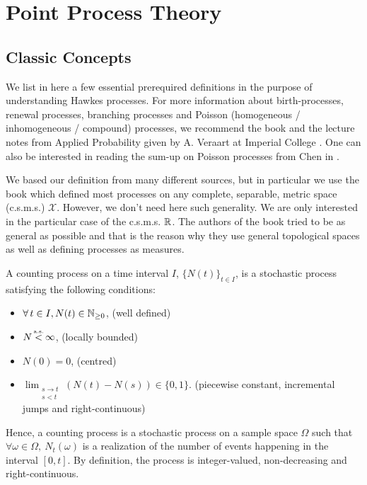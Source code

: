 \documentclass[11pt]{book}
\begin{document}
\section{Point Process Theory}
\subsection{Classic Concepts}
We list in here a few essential prerequired definitions in the purpose of understanding Hawkes processes. For more information about birth-processes, renewal processes, branching processes and Poisson (homogeneous / inhomogeneous / compound) processes, we recommend the book \cite{Grimmett} and the lecture notes from Applied Probability given by A. Veraart at Imperial College \cite{Veraart}. One can also be interested in reading the sum-up on Poisson processes from Chen in \cite{simulchen}.

We based our definition from many different sources, but in particular we use the book \cite{daley} which defined most processes on any complete, separable, metric space (c.s.m.s.) $\mathcal X$. However, we don't need here such generality. We are only interested in the particular case of the c.s.m.s. $\mathbb{R}$. The authors of the book \cite{daley} tried to be as general as possible and that is the reason why they use general topological spaces as well as defining processes as measures. 

\begin{definition}
A counting process on a time interval $I$, $\{N(t)\}_{t \in I}$, is a stochastic process satisfying the following conditions: 
\begin{itemize}
\item $ \forall t \in I, N(t) \in \N $, (well defined)
\item  $N  \stackrel{\mathclap{\mbox{\normalfont\tiny a.s.}}}{<} \infty$, (locally bounded)
\item $ N(0) = 0$, (centred)
\item $ \lim_{ \substack{ s \to t \\ s < t}  } \left ( N(t) - N(s) \right ) \in \{0,1\}$. (piecewise constant, incremental jumps and right-continuous)
\end{itemize}
\end{definition}

Hence, a counting process is a stochastic process on a sample space $\Omega$ such that $ \forall \omega \in \Omega, \ N_t( \omega ) $ is a realization of the number of events happening in the interval $ [ 0,t ]$. By definition, the process is integer-valued, non-decreasing and right-continuous. 
\end{document}
